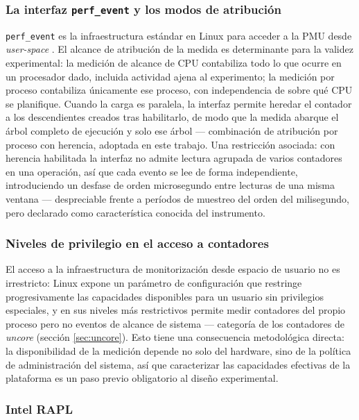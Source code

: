 \documentclass[12pt,oneside,spanish]{book}
\begin{document}
\subsubsection{La interfaz \texttt{perf\_event} y los modos de atribución}
\label{sec:perfevent}

\texttt{perf\_event} es la infraestructura estándar en Linux para acceder a la PMU desde \textit{user-space} \cite{Weaver2015}. El alcance de atribución de la medida es determinante para la validez experimental: la medición de alcance de CPU contabiliza todo lo que ocurre en un procesador dado, incluida actividad ajena al experimento; la medición por proceso contabiliza únicamente ese proceso, con independencia de sobre qué CPU se planifique. Cuando la carga es paralela, la interfaz permite heredar el contador a los descendientes creados tras habilitarlo, de modo que la medida abarque el árbol completo de ejecución y solo ese árbol --- combinación de atribución por proceso con herencia, adoptada en este trabajo. Una restricción asociada: con herencia habilitada la interfaz no admite lectura agrupada de varios contadores en una operación, así que cada evento se lee de forma independiente, introduciendo un desfase de orden microsegundo entre lecturas de una misma ventana --- despreciable frente a períodos de muestreo del orden del milisegundo, pero declarado como característica conocida del instrumento.

\subsubsection{Niveles de privilegio en el acceso a contadores}
\label{sec:paranoid}

El acceso a la infraestructura de monitorización desde espacio de usuario no es irrestricto: Linux expone un parámetro de configuración que restringe progresivamente las capacidades disponibles para un usuario sin privilegios especiales, y en sus niveles más restrictivos permite medir contadores del propio proceso pero no eventos de alcance de sistema --- categoría de los contadores de \textit{uncore} (sección \ref{sec:uncore}). Esto tiene una consecuencia metodológica directa: la disponibilidad de la medición depende no solo del hardware, sino de la política de administración del sistema, así que caracterizar las capacidades efectivas de la plataforma es un paso previo obligatorio al diseño experimental.

\subsubsection{Intel RAPL}
\end{document}
